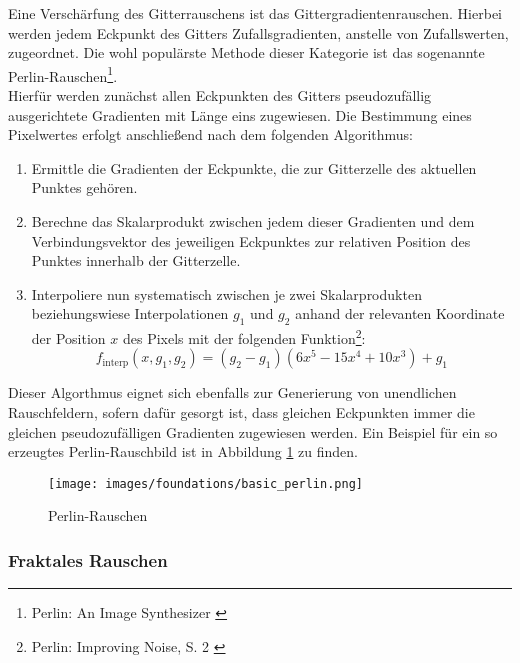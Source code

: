 Eine Verschärfung des Gitterrauschens ist das Gittergradientenrauschen. Hierbei werden jedem Eckpunkt des Gitters Zufallsgradienten, anstelle von Zufallswerten, zugeordnet. Die wohl populärste Methode dieser Kategorie ist das sogenannte Perlin-Rauschen\footnote{
    Perlin: An Image Synthesizer
    \cite{perlin1985image}
}. \\
Hierfür werden zunächst allen Eckpunkten des Gitters pseudozufällig ausgerichtete Gradienten mit Länge eins zugewiesen. Die Bestimmung eines Pixelwertes erfolgt anschließend nach dem folgenden Algorithmus:
\begin{enumerate}
    \item Ermittle die Gradienten der Eckpunkte, die zur Gitterzelle des aktuellen Punktes gehören.
    \item Berechne das Skalarprodukt zwischen jedem dieser Gradienten und dem Verbindungsvektor des jeweiligen Eckpunktes zur relativen Position des Punktes innerhalb der Gitterzelle.
    \item Interpoliere nun systematisch zwischen je zwei Skalarprodukten beziehungswiese Interpolationen $g_1$ und $g_2$ anhand der relevanten Koordinate der Position $x$ des Pixels mit der folgenden Funktion\footnote{
        Perlin: Improving Noise, S. 2
        \cite{perlin2002improving}
    }:
    \begin{equation}
        f_\text{interp}(x, g_1, g_2) = (g_2 - g_1)(6x^5 - 15x^4 + 10x^3) 
        + g_1
    \end{equation}
\end{enumerate}
Dieser Algorthmus eignet sich ebenfalls zur Generierung von unendlichen Rauschfeldern, sofern dafür gesorgt ist, dass gleichen Eckpunkten immer die gleichen pseudozufälligen Gradienten zugewiesen werden. Ein Beispiel für ein so erzeugtes Perlin-Rauschbild ist in Abbildung \ref{fig:basic_perlin} zu finden.
\begin{figure}[ht]
    \centering
    \texttt{[image: images/foundations/basic\_perlin.png]} 
    \caption{Perlin-Rauschen}
    \label{fig:basic_perlin}
\end{figure}


\subsubsection{Fraktales Rauschen}

